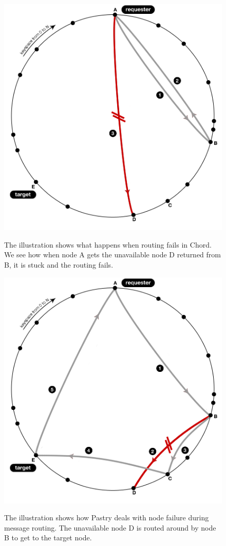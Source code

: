 \begin{figure}[!htb]
\begin{center}
  \label{figChordFailedLookup}
  \includegraphics[width=0.9\linewidth]{illustrations/ChordRoutingFailed.png}
  \caption{The illustration shows what happens when routing fails in Chord. We see how when node A gets the unavailable node D returned from B, it is stuck and the routing fails.}
\end{center}
\end{figure}

\begin{figure}[!htb]
\begin{center}
  \label{figPastryFailedLookip}
  \includegraphics[width=0.9\linewidth]{illustrations/PastryRoutingFailed.png}
  \caption{The illustration shows how Pastry deals with node failure during message routing. The unavailable node D is routed around by node B to get to the target node.}
\end{center}
\end{figure}

